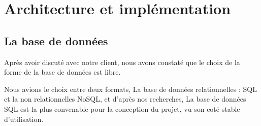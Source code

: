 \documentclass[a4paper, 12pt]{article}
\begin{document}
\newpage
    
\section{Architecture et implémentation}
\subsection{La base de données}

Après avoir discuté avec notre client, nous avons constaté que le choix de la forme de la base de données est libre.

Nous avions le choix entre deux formats, La base de données relationnelles : SQL et la non relationnelles NoSQL, et d'après nos recherches, La base de données SQL est la plus convenable pour la conception du projet, vu son coté stable d'utilisation.
\end{document}
